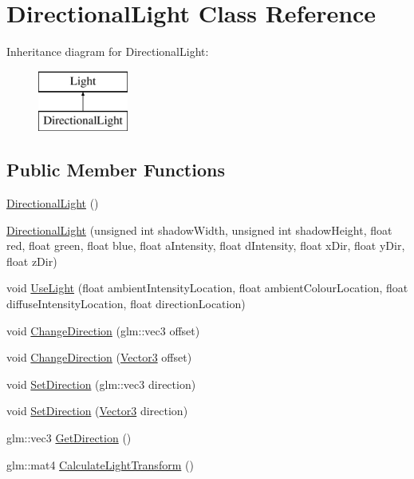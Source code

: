 \hypertarget{class_directional_light}{}\section{Directional\+Light Class Reference}
\label{class_directional_light}
Inheritance diagram for Directional\+Light\+:\begin{figure}[H]
\begin{center}
\leavevmode
\includegraphics[height=2.000000cm]{class_directional_light}
\end{center}
\end{figure}
\subsection*{Public Member Functions}
\begin{DoxyCompactItemize}
\item 
\mbox{\hyperlink{class_directional_light_a949b877ae041b9818f47eb812d80fa1b}{Directional\+Light}} ()
\item 
\mbox{\hyperlink{class_directional_light_a2b2942986587b840fc76ae9da9742cb2}{Directional\+Light}} (unsigned int shadow\+Width, unsigned int shadow\+Height, float red, float green, float blue, float a\+Intensity, float d\+Intensity, float x\+Dir, float y\+Dir, float z\+Dir)
\item 
void \mbox{\hyperlink{class_directional_light_ac5f9c91c9b6c8c0cdc71bbddd053f717}{Use\+Light}} (float ambient\+Intensity\+Location, float ambient\+Colour\+Location, float diffuse\+Intensity\+Location, float direction\+Location)
\item 
void \mbox{\hyperlink{class_directional_light_a4f3b2b67d9411878710d539983850bbd}{Change\+Direction}} (glm\+::vec3 offset)
\item 
void \mbox{\hyperlink{class_directional_light_a667b75a39de2416305a83b2778b928c0}{Change\+Direction}} (\mbox{\hyperlink{struct_vector3}{Vector3}} offset)
\item 
void \mbox{\hyperlink{class_directional_light_ac7c9991c4cc29777c24ebe6ee5c96938}{Set\+Direction}} (glm\+::vec3 direction)
\item 
void \mbox{\hyperlink{class_directional_light_a18772d74dec2b5067c4e6197b9719c3c}{Set\+Direction}} (\mbox{\hyperlink{struct_vector3}{Vector3}} direction)
\item 
glm\+::vec3 \mbox{\hyperlink{class_directional_light_ad3279d493f1c3748ac15d2797bb7016e}{Get\+Direction}} ()
\item 
glm\+::mat4 \mbox{\hyperlink{class_directional_light_a9b1b2bd76bebc68eb71e9dd466504033}{Calculate\+Light\+Transform}} ()
\end{DoxyCompactItemize}
